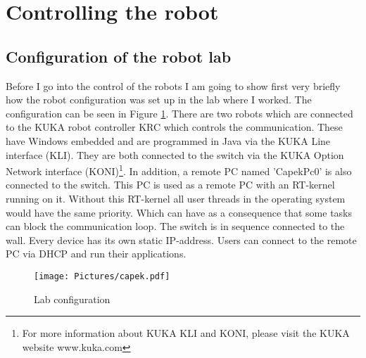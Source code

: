 \documentclass[11pt,a4paper]{report}
\begin{document}
\section{Controlling the robot}
\subsection{Configuration of the robot lab}
Before I go into the control of the robots I am going to show first very briefly how the robot configuration was set up in the lab where I worked. The configuration can be seen in Figure \ref{fig:Configuration}. There are two robots which are connected to the KUKA robot controller KRC which controls the communication. These have Windows embedded and are programmed in Java via the KUKA Line interface (KLI). They are both connected to the switch via the KUKA Option Network interface (KONI)\footnote{For more information about KUKA KLI and KONI, please visit the KUKA website www.kuka.com}. In addition, a remote PC named 'CapekPc0' is also connected to the switch. This PC is used as a remote PC with an RT-kernel running on it. Without this RT-kernel all user threads in the operating system would have the same priority. Which can have as a consequence that some tasks can block the communication loop.  The switch is in sequence connected to the wall. Every device has its own static IP-address. Users can connect to the remote PC via DHCP and run their applications.\cite{VladimirPPT}
\begin{figure}[!ht]
	\centering
	\texttt{[image: Pictures/capek.pdf]}
	\caption{Lab configuration}
	\label{fig:Configuration}
\end{figure}
\newpage
\end{document}
